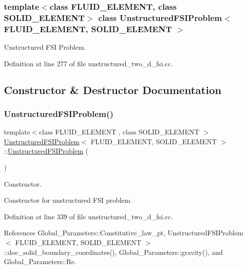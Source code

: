 \subsubsection*{template$<$class F\+L\+U\+I\+D\+\_\+\+E\+L\+E\+M\+E\+NT, class S\+O\+L\+I\+D\+\_\+\+E\+L\+E\+M\+E\+NT$>$\newline
class Unstructured\+F\+S\+I\+Problem$<$ F\+L\+U\+I\+D\+\_\+\+E\+L\+E\+M\+E\+N\+T, S\+O\+L\+I\+D\+\_\+\+E\+L\+E\+M\+E\+N\+T $>$}

Unstructured F\+SI Problem. 

Definition at line 277 of file unstructured\+\_\+two\+\_\+d\+\_\+fsi.\+cc.



\subsection{Constructor \& Destructor Documentation}
\mbox{\label{classUnstructuredFSIProblem_a6a31fd839e0215ef1312942cf7284bd2}} 
\subsubsection{\texorpdfstring{Unstructured\+F\+S\+I\+Problem()}{UnstructuredFSIProblem()}}
{\footnotesize\ttfamily template$<$class F\+L\+U\+I\+D\+\_\+\+E\+L\+E\+M\+E\+NT , class S\+O\+L\+I\+D\+\_\+\+E\+L\+E\+M\+E\+NT $>$ \\
\hyperlink{classUnstructuredFSIProblem}{Unstructured\+F\+S\+I\+Problem}$<$ F\+L\+U\+I\+D\+\_\+\+E\+L\+E\+M\+E\+NT, S\+O\+L\+I\+D\+\_\+\+E\+L\+E\+M\+E\+NT $>$\+::\hyperlink{classUnstructuredFSIProblem}{Unstructured\+F\+S\+I\+Problem} (\begin{DoxyParamCaption}{ }\end{DoxyParamCaption})}



Constructor. 

Constructor for unstructured F\+SI problem. 

Definition at line 339 of file unstructured\+\_\+two\+\_\+d\+\_\+fsi.\+cc.



References Global\+\_\+\+Parameters\+::\+Constitutive\+\_\+law\+\_\+pt, Unstructured\+F\+S\+I\+Problem$<$ F\+L\+U\+I\+D\+\_\+\+E\+L\+E\+M\+E\+N\+T, S\+O\+L\+I\+D\+\_\+\+E\+L\+E\+M\+E\+N\+T $>$\+::doc\+\_\+solid\+\_\+boundary\+\_\+coordinates(), Global\+\_\+\+Parameters\+::gravity(), and Global\+\_\+\+Parameters\+::\+Re.


